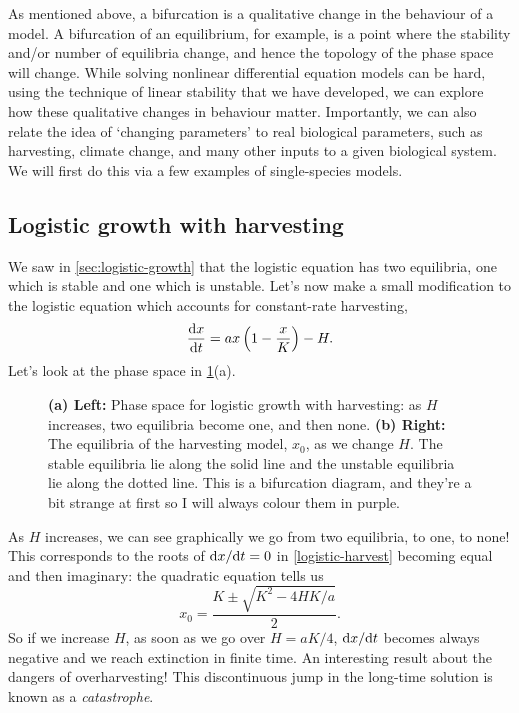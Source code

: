 \documentclass[main.tex]{subfiles}
\begin{document}
As mentioned above, a bifurcation is a qualitative change in the behaviour of a model. A bifurcation of an equilibrium, for example, is a point where the stability and/or number of equilibria change, and hence the topology of the phase space will change. While solving nonlinear differential equation models can be hard, using the technique of linear stability that we have developed, we can explore how these qualitative changes in behaviour matter. Importantly, we can also relate the idea of `changing parameters' to real biological parameters, such as harvesting, climate change, and many other inputs to a given biological system. We will first do this via a few examples of single-species models.

\subsection{Logistic growth with harvesting}\label{sec:harvesting-bif}
We saw in \cref{sec:logistic-growth} that the logistic equation has two equilibria, one which is stable and one which is unstable. Let's now make a small modification to the logistic equation which accounts for constant-rate harvesting,
\begin{equation}
	\label{logistic-harvest}
	\fd{x}{t} = ax\left(1-\frac{x}{K}\right) - H.
\end{equation}
Let's look at the phase space in \cref{fig:logistic-growth-harvesting}(a).
%
\begin{figure}%
	\centering
	\quad
	
	\caption{\textbf{(a) Left:} Phase space for logistic growth with harvesting: as $H$ increases, two equilibria become one, and then none. \textbf{(b) Right:} The equilibria of the harvesting model, $x_0$, as we change $H$. The stable equilibria lie along the solid line and the unstable equilibria lie along the dotted line. This is a bifurcation diagram, and they're a bit strange at first so I will always colour them in purple.}
	\label{fig:logistic-growth-harvesting}
\end{figure}%
%
As $H$ increases, we can see graphically we go from two equilibria, to one, to none! This corresponds to the roots of $\fd{x}{t} = 0$ in \cref{logistic-harvest} becoming equal and then imaginary: the quadratic equation tells us
\begin{equation}
	\label{bifurcation-equilibrium-harvesting}
	x_0 = \frac{K \pm \sqrt{K^2 - 4HK/a}}{2}.
\end{equation}
So if we increase $H$, as soon as we go over $H=aK/4$, $\fd{x}{t}$ becomes always negative and we reach extinction in finite time. An interesting result about the dangers of overharvesting! This discontinuous jump in the long-time solution is known as a \emph{catastrophe}. 
\end{document}
